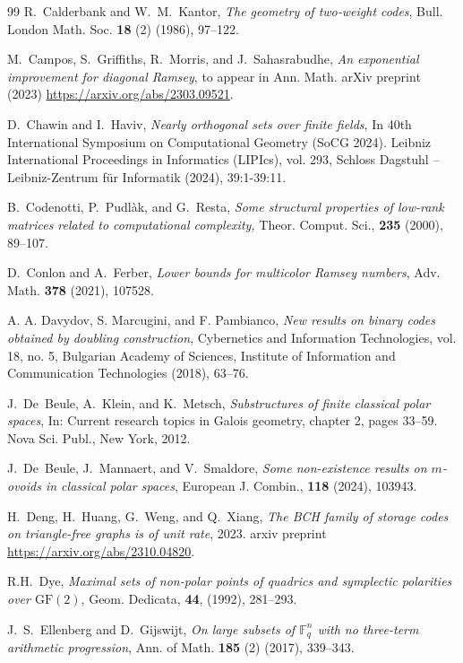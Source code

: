 \documentclass[a4paper,11pt]{amsproc}
\theoremstyle{plain}
\theoremstyle{definition}
\newcommand{\<}{\langle}
\renewcommand{\>}{\rangle} %
\begin{document}
\begin{thebibliography}{99}
R.~Calderbank and W.~M.~Kantor,
{\it The geometry of two‐weight codes}, 
Bull. London Math. Soc. {\bf 18} (2) (1986), 97--122.

M.\ Campos, S.\ Griffiths, R.\ Morris, and J.\ Sahasrabudhe,
{\it An exponential improvement for diagonal {R}amsey}, 
to appear in Ann. Math. arXiv preprint (2023) \url{https://arxiv.org/abs/2303.09521}. 


D.~Chawin and I.~Haviv, 
{\it Nearly orthogonal sets over finite fields}, In 40th International Symposium on Computational Geometry (SoCG 2024). Leibniz International Proceedings in Informatics (LIPIcs), vol. 293, Schloss Dagstuhl – Leibniz-Zentrum f\"{u}r Informatik (2024), 39:1-39:11.

 B.~Codenotti, P.~Pudl\`ak, and G.~Resta, 
 {\it Some structural properties of low-rank matrices related to computational complexity,} Theor. Comput. Sci., {\bf 235} (2000), 89--107. 

D.~Conlon and A.~Ferber,
{\it Lower bounds for multicolor Ramsey numbers}, 
Adv. Math. {\bf 378} (2021), 107528.


 A. A. Davydov, S. Marcugini, and F. Pambianco, {\it New results on binary codes obtained by doubling construction}, Cybernetics and Information Technologies, vol. 18, no. 5, Bulgarian Academy of Sciences, Institute of Information and Communication Technologies (2018), 63--76.

J.~De~Beule, A.~Klein, and K.~Metsch,
{\it Substructures of finite classical polar spaces},
In: Current research topics in Galois geometry, chapter 2, pages 33--59. Nova Sci. Publ., New York, 2012.

J.~De~Beule, J.~Mannaert, and V.~Smaldore,
{\it Some non-existence results on $m$-ovoids in classical polar spaces}, European J. Combin., 
{\bf 118} (2024), 103943.

H.~Deng, H.~Huang, G.~Weng, and Q.~Xiang,
{\it The BCH family of storage codes on triangle-free graphs is of unit rate}, 2023.
arxiv preprint \url{https://arxiv.org/abs/2310.04820}.

R.H.~Dye, {\it Maximal sets of non-polar points of quadrics and symplectic polarities over $\mathrm{GF}(2)$}, Geom. Dedicata, {\bf 44}, (1992), 281--293.

J.~S.~Ellenberg and D.~Gijswijt,
{\it On large subsets of $\mathbb{F}_q^n$ with no three-term arithmetic progression}, Ann. of Math. {\bf 185} (2) (2017), 339--343.


\end{thebibliography}
\end{document}
